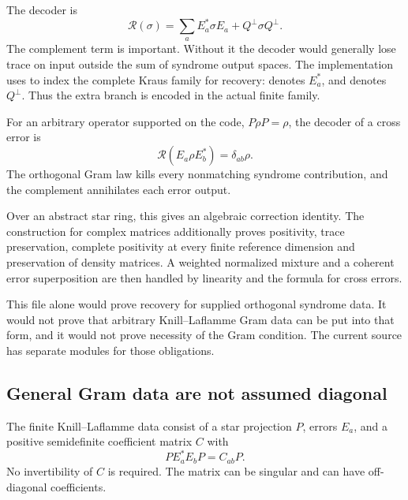 
The decoder is
\[
\mathcal R(\sigma)=\sum_aE_a^*\sigma E_a+Q^\perp\sigma Q^\perp.
\]
The complement term is important. Without it the decoder would generally lose trace on input outside the sum of syndrome output spaces. The implementation uses  to index the complete Kraus family for recovery:  denotes $E_a^*$, and  denotes $Q^\perp$. Thus the extra branch is encoded in the actual finite family.



For an arbitrary operator supported on the code, $P\rho P=\rho$, the decoder of a cross error is
\[
\mathcal R(E_a\rho E_b^*)=\delta_{ab}\rho.
\]
The orthogonal Gram law kills every nonmatching syndrome contribution, and the complement annihilates each error output.


Over an abstract star ring, this gives an algebraic correction identity. The construction for complex matrices additionally proves positivity, trace preservation, complete positivity at every finite reference dimension and preservation of density matrices. A weighted normalized mixture and a coherent error superposition are then handled by linearity and the formula for cross errors.

This file alone would prove recovery for supplied orthogonal syndrome data. It would not prove that arbitrary Knill--Laflamme Gram data can be put into that form, and it would not prove necessity of the Gram condition. The current source has separate modules for those obligations.

\subsection{General Gram data are not assumed diagonal}
The finite Knill--Laflamme data consist of a star projection $P$, errors $E_a$, and a positive semidefinite coefficient matrix $C$ with
\[
PE_a^*E_bP=C_{ab}P.
\]
No invertibility of $C$ is required. The matrix can be singular and can have off-diagonal coefficients.

